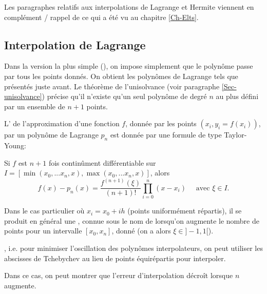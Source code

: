 Les paragraphes relatifs aux interpolations de Lagrange et Hermite viennent en complément / rappel 
de ce qui a été vu au chapitre \ref{Ch-Elts}.

\medskip
\subsection{Interpolation de Lagrange}

Dans la version la plus simple (), on impose simplement que le 
polynôme passe par tous les points donnés. 
On obtient les polynômes de Lagrange tels que présentés juste avant.
Le théorème de l'unisolvance (voir paragraphe \ref{Sec-unisolvance}) précise qu'il n'existe qu'un seul 
polynôme de degré $n$ au plus défini par un ensemble de $n+1$ points.

\medskip
L' de l'approximation d'une fonction $f$, donnée par les points 
$(x_i,y_i=f(x_i))$, par un polynôme de Lagrange $p_n$ est donnée par une formule de type 
Taylor-Young:

Si $f$ est $n+1$ fois continûment différentiable sur $I=[\min(x_0,...x_n,x),\max(x_0,...x_n,x)]$, alors
\begin{equation}
    f(x) - p_n(x) = \frac{f^{(n+1)}(\xi)}{(n+1)!} \prod_{i=0}^n (x-x_i) \quad \text{ avec } \xi \in I.
\end{equation}

\medskip
Dans le cas particulier où $x_i = x_0 + ih$ (points uniformément répartis), il se produit en général 
une , connue sous le nom de 
lorsqu'on augmente le nombre de points pour un intervalle $[x_0,x_n]$, donné (on a alors $\xi\in]-1,1[$).

\medskip
{}, i.e. 
pour minimiser l'oscillation des polynômes interpolateurs, on peut utiliser les abscisses de 
Tchebychev au lieu de points 
équirépartis pour interpoler. 

Dans ce cas, on peut montrer que l'erreur d'interpolation décroît lorsque $n$ augmente.

